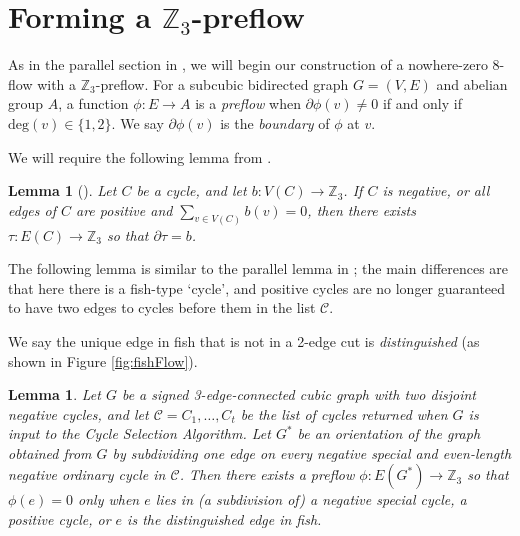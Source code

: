 \documentclass[12pt]{article}
\newcommand{\Z}{\mathbb{Z}}
\newtheorem{lemma}[theorem]{Lemma}
\begin{document}
\section{Forming a ${\mathbb Z}_3$-preflow}\label{3ecZ3pre}

As in the parallel section in \cite{devos2023nowherezero}, we will begin our construction of a nowhere-zero 8-flow with a $\Z_3$-preflow. For a subcubic bidirected graph $G = (V,E)$ and abelian group $A$, a function $\phi : E \rightarrow A$ is a \emph{preflow} when $\partial \phi (v) \neq 0$ if and only if $\mathrm{deg}(v) \in \{1,2\}$. We say $\partial\phi(v)$ is the \emph{boundary} of $\phi$ at $v$.

We will require the following lemma from \cite{devos2023nowherezero}.

\begin{lemma}[\cite{devos2023nowherezero}]
\label{cycle_boundary1}
Let $C$ be a cycle, and let $b: V(C) \rightarrow {\mathbb Z}_3$.  If $C$ is negative, or all edges of $C$ are positive and $\sum_{v \in V(C)} b(v) = 0$,
then there exists $\tau : E(C) \rightarrow {\mathbb Z}_3$ so that $\partial \tau = b$.
\end{lemma}


The following lemma is similar to the parallel lemma in \cite{devos2023nowherezero}; the main differences are that here there is a fish-type `cycle', and positive cycles are no longer guaranteed to have two edges to cycles before them in the list $\mathcal{C}$. 

We say the unique edge in fish that is not in a 2-edge cut is \emph{distinguished} (as shown in Figure \ref{fig:fishFlow}).

\begin{lemma}\label{lem:buildPreflow}
        Let $G$ be a signed 3-edge-connected cubic graph with two disjoint negative cycles, and let $\mathcal{C} = C_1, \dots, C_t$ be the list of cycles returned when $G$ is input to the Cycle Selection Algorithm.  Let $G^*$ be an orientation of the graph obtained from $G$ by subdividing one edge on every negative special and even-length negative ordinary cycle in $\mathcal{C}$.  Then there exists a preflow $\phi: E(G^*) \rightarrow \mathbb{Z}_3$ so that $\phi(e) = 0$ only when $e$ lies in (a subdivision of) a negative special cycle, a positive cycle, or $e$ is the distinguished edge in fish. 
\end{lemma}
\end{document}

